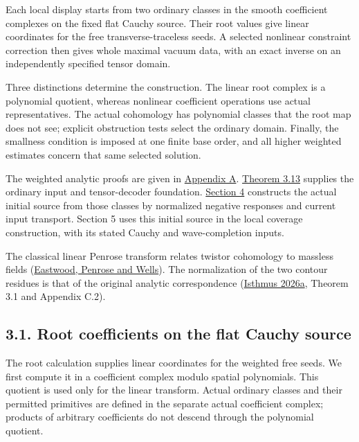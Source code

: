 \documentclass[
  english,
  11pt,
  reqno]{amsart}
\begin{document}
Each local display starts from two ordinary classes in the smooth
coefficient complexes on the fixed flat Cauchy source. Their root values
give linear coordinates for the free transverse-traceless seeds. A
selected nonlinear constraint correction then gives whole maximal vacuum
data, with an exact inverse on an independently specified tensor domain.

Three distinctions determine the construction. The linear root complex
is a polynomial quotient, whereas nonlinear coefficient operations use
actual representatives. The actual cohomology has polynomial classes
that the root map does not see; explicit obstruction tests select the
ordinary domain. Finally, the smallness condition is imposed at one
finite base order, and all higher weighted estimates concern that same
selected solution.

The weighted analytic proofs are given in
\hyperref[app:online-weighted-construction]{Appendix A}.
\hyperref[thm:online-ordinary-pair-data-bijection]{Theorem 3.13}
supplies the ordinary input and tensor-decoder foundation.
\hyperref[sec:online-actual-source-execution]{Section 4} constructs the
actual initial source from those classes by normalized negative
responses and current input transport. Section 5 uses this initial
source in the local coverage construction, with its stated Cauchy and
wave-completion inputs.

The classical linear Penrose transform relates twistor cohomology to
massless fields (\hyperref[ref-EastwoodPenroseWells1981]{Eastwood,
Penrose and Wells}). The normalization of the two contour residues is
that of the original analytic correspondence
(\hyperref[ref-IsthmusLocal2026]{Isthmus 2026a}, Theorem 3.1 and
Appendix C.2).

\subsection{3.1. Root coefficients on the flat Cauchy
source}\label{root-coefficients-on-the-flat-cauchy-source}\label{sec:online-root-complex}

The root calculation supplies linear coordinates for the weighted free
seeds. We first compute it in a coefficient complex modulo spatial
polynomials. This quotient is used only for the linear transform. Actual
ordinary classes and their permitted primitives are defined in the
separate actual coefficient complex; products of arbitrary coefficients
do not descend through the polynomial quotient.
\end{document}
